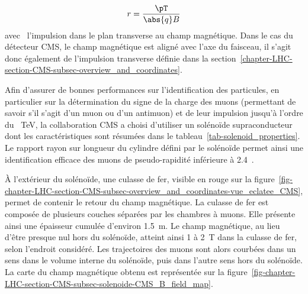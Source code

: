 \begin{equation}
r = \frac{\pT}{\abs{q}B}
\label{eq-chapter-LHC-section-CMS-subsec-solenoide-rayon_courbure}
\end{equation}
avec \pT\ l'impulsion dans le plan transverse au champ magnétique.
Dans le cas du détecteur CMS, le champ magnétique est aligné avec l'axe du faisceau, il s'agit donc également de l'impulsion transverse définie dans la section~\ref{chapter-LHC-section-CMS-subsec-overview_and_coordinates}.
\par Afin d'assurer de bonnes performances sur l'identification des particules, en particulier sur la détermination du signe de la charge des muons (permettant de savoir s'il s'agit d'un muon ou d'un antimuon) et de leur impulsion jusqu'à l'ordre du \SI{}{\TeV}, la collaboration CMS a choisi d'utiliser un solénoïde supraconducteur~\cite{cms_paper,CMS_TDR_1,CERN-LHCC-97-010,CMS_magnet} dont les caractéristiques sont résumées dans le tableau~\ref{tab-solenoid_properties}.
Le rapport rayon sur longueur du cylindre défini par le solénoïde permet ainsi une identification efficace des muons de pseudo-rapidité inférieure à \num{2.4}~\cite{CERN-LHCC-97-010}.
\par À l'extérieur du solénoïde, une culasse de fer, visible en rouge sur la figure~\ref{fig-chapter-LHC-section-CMS-subsec-overview_and_coordinates-vue_eclatee_CMS}, permet de contenir le retour du champ magnétique.
La culasse de fer est composée de plusieurs couches séparées par les chambres à muons.
Elle présente ainsi une épaisseur cumulée d'environ \SI{1.5}{\meter}.
Le champ magnétique, au lieu d'être presque nul hors du solénoïde, atteint ainsi \num{1} à \SI{2}{\tesla} dans la culasse de fer, selon l'endroit considéré.
Les trajectoires des muons sont alors courbées dans un sens dans le volume interne du solénoïde, puis dans l'autre sens hors du solénoïde.
La carte du champ magnétique obtenu est représentée sur la figure~\ref{fig-chapter-LHC-section-CMS-subsec-solenoide-CMS_B_field_map}.